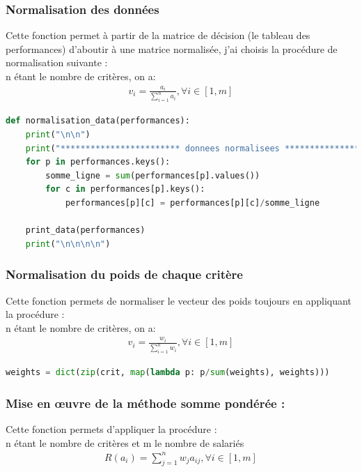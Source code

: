 \subsubsection{Normalisation des données }
Cette fonction permet à partir de la matrice de décision (le tableau des performances) d’aboutir à une matrice normalisée, j’ai choisis la procédure de normalisation suivante  : \\
n étant le nombre de critères, on a:
\begin{align*}
v_{i} = \frac{a_{i}}{\sum_{i=1}^{n}a_{i} }, \forall i \in [1, m]
\end{align*}
\begin{lstlisting}[language=Python, frame=single, firstnumber=63]
def normalisation_data(performances):
    print("\n\n")
    print("************************ donnees normalisees ************************")
    for p in performances.keys():
        somme_ligne = sum(performances[p].values())
        for c in performances[p].keys():
            performances[p][c] = performances[p][c]/somme_ligne
        
    print_data(performances)
    print("\n\n\n\n")                      

\end{lstlisting}

\subsubsection{Normalisation du poids de chaque critère}
Cette fonction permets de normaliser le vecteur des poids toujours en appliquant la procédure :\\
n étant le nombre de critères, on a:
\begin{align*}
v_{i} = \frac{w_{i}}{\sum_{i=1}^{n}w_{i}}, \forall i \in [1, m]
\end{align*}

\begin{lstlisting}[language=Python, frame=single, firstnumber=49]
weights = dict(zip(crit, map(lambda p: p/sum(weights), weights)))
\end{lstlisting}

\subsubsection{Mise en œuvre de la méthode somme pondérée :}
Cette fonction permets d’appliquer la procédure : \\
n étant le nombre de critères et m le nombre de salariés
\begin{align*}
R(a_{i}) = \sum_{j=1}^{n}w_{j}a_{ij}, \forall i \in [1, m]
\end{align*}

